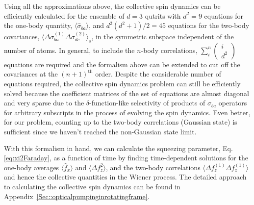 \documentclass[aps,pra,twocolumn,superscriptaddress]{revtex4-1} %
\newcommand{\expect}[1]{\big\langle #1 \big\rangle}
\begin{document}
Using all the approximations above, the collective spin dynamics can be efficiently calculated for the ensemble of $d=3$  qutrits with $ d^2=9 $ equations for the one-body quantity, $ \expect{\hat{\sigma}_{ba}} $, and $ d^2(d^2+1)/2=45 $ equations for the two-body covariances, $ \expect{\Delta \sigma_{ba}^{(1)}\Delta\sigma_{dc}^{(2)} }_s $, in the symmetric subspace independent of the number of atoms.
In general, to include the $ n $-body correlations, $ \sum_i^n\left(\!\begin{array}{c}i\\d^2\end{array} \! \right) $ equations are required and the formalism above can be extended to cut off the covariances at the $ (n+1)^{\text{th}} $ order. Despite the considerable number of equations required, the collective spin dynamics problem can still be efficiently solved because the coefficient matrices of the set of equations are almost diagonal and very sparse due to the $ \delta $-function-like selectivity of products of $ \hat{\sigma}_{ba} $ operators for arbitrary subscripts in the process of evolving the spin dynamics. Even better, for our problem, counting up to the two-body correlations (Gaussian state) is sufficient since we haven't reached the non-Gaussian state limit.

With this formalism in hand, we can calculate the squeezing parameter, Eq.\eqref{eq:xi2Faraday}, as a function of time by finding time-dependent solutions for the one-body averages $\expect{\hat{f}_x}$ and  $\expect{\Delta f_z^2}$, and the two-body correlations $\expect{\Delta f_z^{(1)} \Delta f_z^{(1)}}$ and hence the collective quantities in the Wiener process.  The detailed approach to calculating the collective spin dynamics can be found in Appendix~\ref{Sec::opticalpumpinginrotatingframe}.
\end{document}
